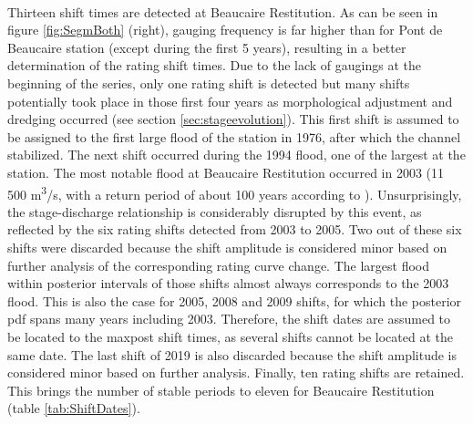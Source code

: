 \documentclass[11pt]{article}
\begin{document}
    \paragraph{}    
    Thirteen shift times are detected at Beaucaire Restitution. As can be seen in figure \ref{fig:SegmBoth} (right), gauging frequency is far higher than for Pont de Beaucaire station (except during the first 5 years), resulting in a better determination of the rating shift times. 
    Due to the lack of gaugings at the beginning of the series, only one rating shift is detected but many shifts potentially took place in those first four years as morphological adjustment and dredging occurred (see section \ref{sec:stageevolution}). This first shift is assumed to be assigned to the first large flood of the station in 1976, after which the channel stabilized. The next shift occurred during the 1994 flood, one of the largest at the station. The most notable flood at Beaucaire Restitution occurred in 2003 (11 500 m\textsuperscript{3}/s, with a return period of about 100 years according to \citet{medd_debit_2005}). Unsurprisingly, the stage-discharge relationship is considerably disrupted by this event, as reflected by the six rating shifts detected from 2003 to 2005. Two out of these six shifts were discarded because the shift amplitude is considered minor based on further analysis of the corresponding rating curve change. The largest flood within posterior intervals of those shifts almost always corresponds to the 2003 flood. This is also the case for 2005, 2008 and 2009 shifts, for which the posterior pdf spans many years including 2003. Therefore, the shift dates are assumed to be located to the maxpost shift times, as several shifts cannot be located at the same date. The last shift of 2019 is also discarded because the shift amplitude is considered minor based on further analysis. Finally, ten rating shifts are retained. This brings the number of stable periods to eleven for Beaucaire Restitution (table \ref{tab:ShiftDates}). 
    \FloatBarrier
\end{document}
